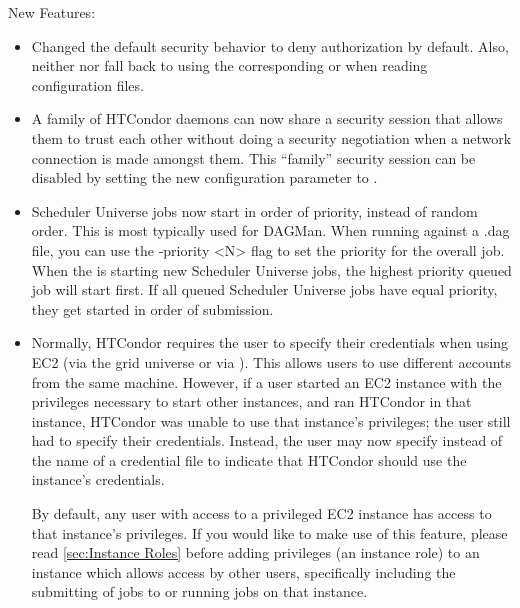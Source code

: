 \noindent New Features:

\begin{itemize}

\item Changed the default security behavior to deny authorization by default.
Also, neither  nor  fall back
to using the corresponding  or 
when reading configuration files.

\item A family of HTCondor daemons can now share a security session that
allows them to trust each other without doing a security negotiation
when a network connection is made amongst them.
This ``family'' security session can be disabled by setting the new
configuration parameter  to .

\item Scheduler Universe jobs now start in order of priority, instead of random
order. This is most typically used for DAGMan. When running 
against a .dag file, you can use the -priority <N> flag to set the priority
for the overall  job. When the  is starting new
Scheduler Universe jobs, the highest priority queued job will start first. If
all queued Scheduler Universe jobs have equal priority, they get started in
order of submission.

\item  Normally, HTCondor requires the user to specify their credentials
when using EC2 (via the grid universe or via ).  This allows
users to use different accounts from the same machine.  However,
if a user started an EC2 instance with the privileges necessary to start
other instances, and ran HTCondor in that instance, HTCondor was unable to
use that instance's privileges; the user still had to specify their
credentials.  Instead, the user may now specify  instead
of the name of a credential file to indicate that HTCondor should use the
instance's credentials.

By default, any user with access to a privileged EC2 instance has access to
that instance's privileges.  If you would like to make use of this feature,
please read \ref{sec:Instance Roles} before adding privileges (an instance
role) to an instance which allows access by other users, specifically
including the submitting of jobs to or running jobs on that instance.


\end{itemize}
